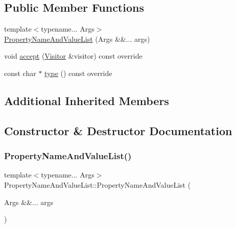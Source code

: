 \subsection*{Public Member Functions}
\begin{DoxyCompactItemize}
\item 
{\footnotesize template$<$typename... Args$>$ }\\\hyperlink{struct_property_name_and_value_list_a2d30757908614516a1792fbae0610396}{Property\+Name\+And\+Value\+List} (Args \&\&... args)
\item 
void \hyperlink{struct_property_name_and_value_list_a9de0000cc5d14bb2c24d643fe3dab043}{accept} (\hyperlink{struct_visitor}{Visitor} \&visitor) const override
\item 
const char $\ast$ \hyperlink{struct_property_name_and_value_list_af7fee32b31b1e3c163de8344988307c8}{type} () const override
\end{DoxyCompactItemize}
\subsection*{Additional Inherited Members}


\subsection{Constructor \& Destructor Documentation}
\mbox{\label{struct_property_name_and_value_list_a2d30757908614516a1792fbae0610396}} 
\subsubsection{\texorpdfstring{Property\+Name\+And\+Value\+List()}{PropertyNameAndValueList()}}
{\footnotesize\ttfamily template$<$typename... Args$>$ \\
Property\+Name\+And\+Value\+List\+::\+Property\+Name\+And\+Value\+List (\begin{DoxyParamCaption}\item[{Args \&\&...}]{args }\end{DoxyParamCaption})\hspace{0.3cm}{\ttfamily [inline]}}



